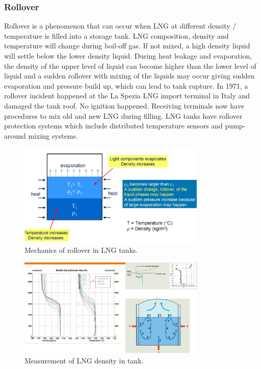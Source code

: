 \subsubsection{Rollover}
Rollover is a phenomenon that can occur when LNG at different density / temperature is filled into a storage tank. LNG composition, density and temperature will change during boil-off gas. If not mixed, a high density liquid will settle below the lower density liquid. During heat leakage and evaporation, the density of the upper level of liquid can become higher than the lower level of liquid and a sudden rollover with mixing of the liquids may occur giving sudden evaporation and pressure build up, which can lead to tank rupture. In 1971, a rollover incident happened at the La Spezia LNG import terminal in Italy and damaged the tank roof. No ignition happened. Receiving terminals now have procedures to mix old and new LNG during filling. LNG tanks have rollover protection systems which include distributed temperature sensors and pump-around mixing systems.
\begin{figure}[H]
    \centering
    \includegraphics[width = 0.8\textwidth]{img/figure65.png}
    \caption{Mechanics of rollover in LNG tanks.}
\end{figure}
\begin{figure}[H]
    \centering
    \includegraphics[width = 0.8\textwidth]{img/figure66.png}
    \caption{Measurement of LNG density in tank.}
\end{figure}
